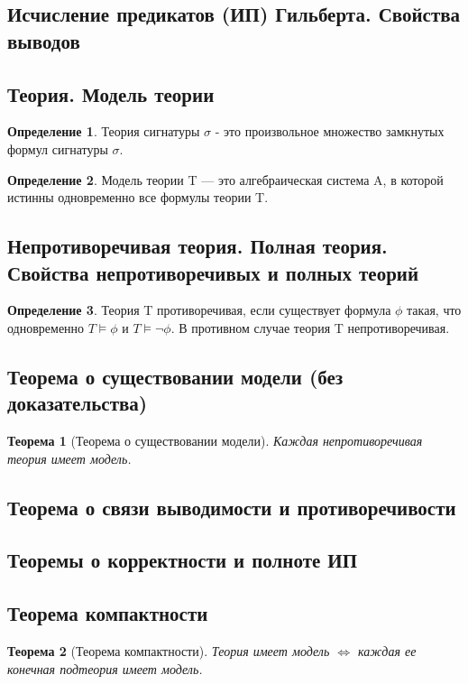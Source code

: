 \documentclass[a4paper]{article}
\newtheorem{theorem}{Теорема}[section]
\theoremstyle{definition}
\newtheorem*{definition}{Определение}
\theoremstyle{remark}
\begin{document}
    \subsection{Исчисление предикатов (ИП)  Гильберта. Свойства выводов}
    \subsection{Теория. Модель теории}
    \begin{definition}
        Теория сигнатуры $\sigma$ - это произвольное множество замкнутых формул сигнатуры  $\sigma$.
    \end{definition}
    \begin{definition}
        Модель теории T — это алгебраическая система A, в которой истинны одновременно все 
    формулы теории T.
    \end{definition}
    \subsection{Непротиворечивая теория. Полная теория. Свойства непротиворечивых и полных теорий}
    \begin{definition}
        Теория T противоречивая, если существует формула $\phi$ такая, что одновременно 
    $T \models \phi$ и $T \models \neg\phi$. В противном случае теория T непротиворечивая.
    \end{definition}
    \subsection{Теорема о существовании модели (без доказательства)}
    \begin{theorem}[Теорема о существовании модели]
        Каждая непротиворечивая теория имеет модель. 
    \end{theorem}
    \subsection{Теорема о связи выводимости и противоречивости}
    \subsection{Теоремы о корректности и полноте ИП}
    \subsection{Теорема компактности}
    \begin{theorem}[Теорема компактности]
        Теория имеет модель $\Leftrightarrow$ каждая ее конечная подтеория имеет модель. 
    \end{theorem}
\end{document}
